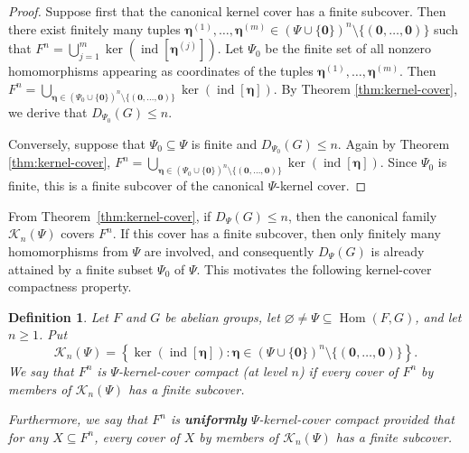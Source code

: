 \documentclass[a4paper, 12pt]{article}
\newtheorem{definition}[theorem]{Definition}
\begin{document}
\begin{proof}
Suppose first that the canonical kernel cover has a finite subcover.
Then there exist finitely many tuples
$\boldsymbol{\eta}^{(1)},\ldots,\boldsymbol{\eta}^{(m)}
\in
(\Psi\cup\{\mathbf 0\})^n
\setminus\{(\mathbf 0,\ldots,\mathbf 0)\}$
such that
$F^n=
\bigcup_{j=1}^{m}
\ker(\operatorname{ind}[\boldsymbol{\eta}^{(j)}]).$
Let $\Psi_0$ be the finite set of all nonzero homomorphisms appearing
as coordinates of the tuples
$\boldsymbol{\eta}^{(1)},\ldots,\boldsymbol{\eta}^{(m)}$.
Then $F^n=
\bigcup_{\boldsymbol{\eta}\in
(\Psi_0\cup\{\mathbf 0\})^n
\setminus\{(\mathbf 0,\ldots,\mathbf 0)\}}
\ker(\operatorname{ind}[\boldsymbol{\eta}]).$
By Theorem \ref{thm:kernel-cover}, we derive that
$D_{\Psi_0}(G)\leq n.$

Conversely, suppose that $\Psi_0\subseteq\Psi$ is finite and
$D_{\Psi_0}(G)\le n$. Again by  Theorem \ref{thm:kernel-cover},
$F^n=
\bigcup_{\boldsymbol{\eta}\in
(\Psi_0\cup\{\mathbf 0\})^n
\setminus\{(\mathbf 0,\ldots,\mathbf 0)\}}
\ker(\operatorname{ind}[\boldsymbol{\eta}]).$
Since $\Psi_0$ is finite, this is a finite subcover of the canonical
$\Psi$-kernel cover.
\end{proof}





From Theorem~\ref{thm:kernel-cover}, if $D_{\Psi}(G)\le n$, then the
canonical family $\mathcal K_n(\Psi)$ covers $F^n$.  If this cover
has a finite subcover, then only finitely many homomorphisms from
$\Psi$ are involved, and consequently $D_{\Psi}(G)$ is already
attained by a finite subset $\Psi_0$ of $\Psi$.
This motivates the following
kernel-cover compactness property.



\begin{definition}
Let $F$ and $G$ be abelian groups, let
$\varnothing\neq\Psi\subseteq\operatorname{Hom}(F,G)$, and let $n\ge1$. Put
$$
\mathcal K_n(\Psi)
=
\left\{
\ker(\operatorname{ind}[\boldsymbol{\eta}]):
\boldsymbol{\eta}\in
(\Psi\cup\{\mathbf 0\})^n
\setminus\{(\mathbf 0,\ldots,\mathbf 0)\}
\right\}.
$$
We say that $F^n$ is \emph{$\Psi$-kernel-cover compact} (at level $n$)
if every cover of $F^n$ by members of $\mathcal K_n(\Psi)$ has a
finite subcover.


Furthermore, we say that $F^n$ is {\bf uniformly} \emph{$\Psi$-kernel-cover compact} provided that for any $X\subseteq F^n$, every cover of $X$ by members of $\mathcal K_n(\Psi)$ has a
finite subcover.
\end{definition}
\end{document}
